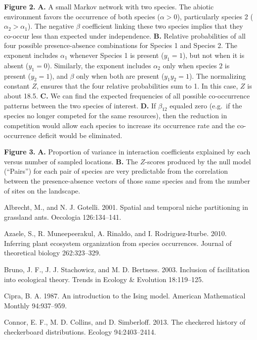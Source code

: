 \documentclass[12pt,]{article}
\begin{document}
\begin{spacing}{1.9}
\begin{flushleft}
\textbf{Figure 2.} \textbf{A.} A small Markov network with two species.
The abiotic environment favors the occurrence of both species
(\(\alpha >0\)), particularly species 2 (\(\alpha_2 > \alpha_1\)). The
negative \(\beta\) coefficient linking these two species implies that
they co-occur less than expected under independence. \textbf{B.}
Relative probabilities of all four possible presence-absence
combinations for Species 1 and Species 2. The exponent includes
\(\alpha_1\) whenever Species 1 is present (\(y_1 = 1\)), but not when
it is absent (\(y_1 = 0\)). Similarly, the exponent includes
\(\alpha_2\) only when species \(2\) is present (\(y_2 = 1\)), and
\(\beta\) only when both are present (\(y_1y_2 = 1\)). The normalizing
constant \(Z\), ensures that the four relative probabilities sum to 1.
In this case, \(Z\) is about 18.5. \textbf{C.} We can find the expected
frequencies of all possible co-occurrence patterns between the two
species of interest. \textbf{D.} If \(\beta_{12}\) equaled zero (e.g.~if
the species no longer competed for the same resources), then the
reduction in competition would allow each species to increase its
occurrence rate and the co-occurrence deficit would be eliminated.

\textbf{Figure 3.} \textbf{A.} Proportion of variance in interaction
coefficients explained by each versus number of sampled locations.
\textbf{B.} The \(Z\)-scores produced by the null model (``Pairs'') for
each pair of species are very predictable from the correlation between
the presence-absence vectors of those same species and from the number
of sites on the landscape.

\setlength{\parskip}{0pt} \setlength{\parindent}{-1em}
\setlength{\leftskip}{1em}

Albrecht, M., and N. J. Gotelli. 2001. Spatial and temporal niche
partitioning in grassland ants. Oecologia 126:134--141.

Azaele, S., R. Muneepeerakul, A. Rinaldo, and I. Rodriguez-Iturbe. 2010.
Inferring plant ecosystem organization from species occurrences. Journal
of theoretical biology 262:323--329.

Bruno, J. F., J. J. Stachowicz, and M. D. Bertness. 2003. Inclusion of
facilitation into ecological theory. Trends in Ecology \& Evolution
18:119--125.

Cipra, B. A. 1987. An introduction to the Ising model. American
Mathematical Monthly 94:937--959.

Connor, E. F., M. D. Collins, and D. Simberloff. 2013. The checkered
history of checkerboard distributions. Ecology 94:2403--2414.


\end{flushleft}
\end{spacing}
\end{document}
